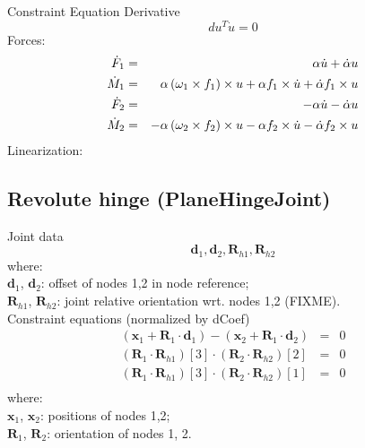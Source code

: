 \documentclass[10pt,dvips]{report}
\newcommand{\T}[1]{\boldsymbol{#1}}
\begin{document}
Constraint Equation Derivative
\begin{displaymath}
	d u^T\dot{u} = 0
\end{displaymath}
Forces:
\begin{eqnarray*}
	\dot{F}_1 & = &  \alpha \dot{u} + \dot{\alpha} u \\
	\dot{M}_1 & = & \alpha \left( \omega_1\times{f_1} \right) \times u 
		+ \alpha f_1 \times \dot{u}
		+ \dot{\alpha} f_1 \times u \\
	\dot{F}_2 & = & -\alpha \dot{u} - \dot{\alpha} u \\
	\dot{M}_2 & = & -\alpha \left( \omega_2 \times{f_2} \right) \times u
		- \alpha f_2 \times \dot{u}
		- \dot{\alpha} f_2 \times u
\end{eqnarray*}
Linearization:





\subsection{Revolute hinge (PlaneHingeJoint)}
Joint data
\begin{displaymath}
\T d_1, \T d_2, \T R_{h1}, \T R_{h2}
\end{displaymath}
where:\\
$\T d_1$, $\T d_2$: offset of nodes 1,2 in node reference;\\
$\T R_{h1}$, $\T R_{h2}$: joint relative orientation wrt. nodes 1,2 (FIXME).\\

\noindent
Constraint equations (normalized by dCoef)
\begin{eqnarray*}
	(\T x_1+\T R_1\cdot \T d_1) - (\T x_2+\T R_1\cdot \T d_2)& = & 0 \\
	(\T R_1\cdot \T R_{h1})[3]\cdot (\T R_2\cdot \T R_{h2})[2] & = & 0 \\
	(\T R_1\cdot \T R_{h1})[3]\cdot (\T R_2\cdot \T R_{h2})[1] & = & 0 \\
\end{eqnarray*}
where:\\
$\T x_1$, $\T x_2$: positions of nodes 1,2;\\
$\T R_{1}$, $\T R_{2}$: orientation of nodes 1, 2.\\
\end{document}
